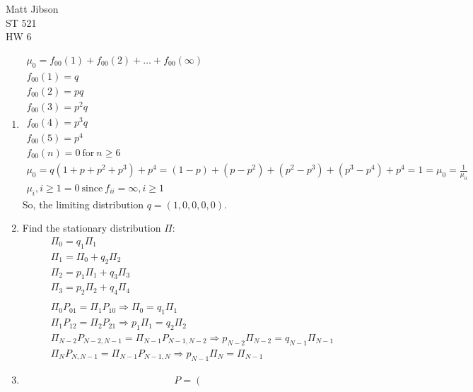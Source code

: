 \documentclass{article}
\begin{document}
\begin{flushright}
Matt Jibson \\
ST 521 \\
HW 6
\end{flushright}

\begin{enumerate}
	\item %
		\begin{displaymath} \begin{array}{l}
			\mu_0 = f_{00}(1) + f_{00}(2) + \dots + f_{00}(\infty) \\
			f_{00}(1) = q \\
			f_{00}(2) = pq \\
			f_{00}(3) = p^2 q \\
			f_{00}(4) = p^3 q \\
			f_{00}(5) = p^4 \\
			f_{00}(n) = 0 \mathrm{\ for\ } n \ge 6 \\
			\mu_0 = q (1 + p + p^2 + p^3) + p^4 = (1 - p) + (p - p^2) + (p^2 - p^3) + (p^3 - p^4) + p^4 = 1 = \mu_0 = \frac{1}{\mu_0} \\
			\mu_i, i \ge 1 = 0 \mathrm{\ since\ } f_{ii} = \infty, i \ge 1
		\end{array} \end{displaymath}
		So, the limiting distribution $q = (1, 0, 0, 0, 0)$.
	\item %
		Find the stationary distribution $\Pi$:
		\begin{displaymath} \begin{array}{l}
			\Pi_0 = q_1 \Pi_1 \\
			\Pi_1 = \Pi_0 + q_2 \Pi_2 \\
			\Pi_2 = p_1 \Pi_1 + q_3 \Pi_3 \\
			\Pi_3 = p_2 \Pi_2 + q_4 \Pi_4 \\
			\\
			\Pi_0 P_{01} = \Pi_1 P_{10} \Rightarrow \Pi_0 = q_1 \Pi_1 \\
			\Pi_1 P_{12} = \Pi_2 P_{21} \Rightarrow p_1 \Pi_1 = q_2 \Pi_2 \\
			\Pi_{N-2} P_{N-2, N-1} = \Pi_{N-1} P_{N-1, N-2} \Rightarrow p_{N-2} \Pi_{N-2} = q_{N-1} \Pi_{N-1} \\
			\Pi_N P_{N, N-1} = \Pi_{N-1} P_{N-1, N} \Rightarrow p_{N-1} \Pi_N = \Pi_{N-1}
		\end{array} \end{displaymath}
	\item %
		\begin{displaymath}
			P = \left( \begin{array}{ccccc}

\end{array}
\end{displaymath}
\end{enumerate}
\end{document}
